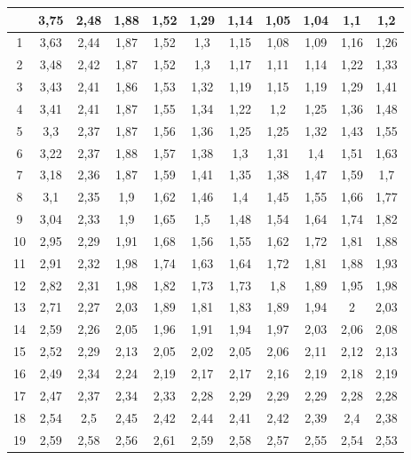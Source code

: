 \begin{longtable}[H]{|c|c|c|c|c|c|c|c|c|c|c|}
{    0 & 3,75 & 2,48 & 1,88 & 1,52 & 1,29 & 1,14 & 1,05 & 1,04 & 1,1 & 1,2  \\ \hline
    1 & 3,63 & 2,44 & 1,87 & 1,52 & 1,3 & 1,15 & 1,08 & 1,09 & 1,16 & 1,26  \\ \hline
    2 & 3,48 & 2,42 & 1,87 & 1,52 & 1,3 & 1,17 & 1,11 & 1,14 & 1,22 & 1,33  \\ \hline
    3 & 3,43 & 2,41 & 1,86 & 1,53 & 1,32 & 1,19 & 1,15 & 1,19 & 1,29 & 1,41  \\ \hline
    4 & 3,41 & 2,41 & 1,87 & 1,55 & 1,34 & 1,22 & 1,2 & 1,25 & 1,36 & 1,48  \\ \hline
    5 & 3,3 & 2,37 & 1,87 & 1,56 & 1,36 & 1,25 & 1,25 & 1,32 & 1,43 & 1,55  \\ \hline
    6 & 3,22 & 2,37 & 1,88 & 1,57 & 1,38 & 1,3 & 1,31 & 1,4 & 1,51 & 1,63  \\ \hline
    7 & 3,18 & 2,36 & 1,87 & 1,59 & 1,41 & 1,35 & 1,38 & 1,47 & 1,59 & 1,7  \\ \hline
    8 & 3,1 & 2,35 & 1,9 & 1,62 & 1,46 & 1,4 & 1,45 & 1,55 & 1,66 & 1,77  \\ \hline
    9 & 3,04 & 2,33 & 1,9 & 1,65 & 1,5 & 1,48 & 1,54 & 1,64 & 1,74 & 1,82  \\ \hline
    10 & 2,95 & 2,29 & 1,91 & 1,68 & 1,56 & 1,55 & 1,62 & 1,72 & 1,81 & 1,88  \\ \hline
    11 & 2,91 & 2,32 & 1,98 & 1,74 & 1,63 & 1,64 & 1,72 & 1,81 & 1,88 & 1,93  \\ \hline
    12 & 2,82 & 2,31 & 1,98 & 1,82 & 1,73 & 1,73 & 1,8 & 1,89 & 1,95 & 1,98  \\ \hline
    13 & 2,71 & 2,27 & 2,03 & 1,89 & 1,81 & 1,83 & 1,89 & 1,94 & 2 & 2,03  \\ \hline
    14 & 2,59 & 2,26 & 2,05 & 1,96 & 1,91 & 1,94 & 1,97 & 2,03 & 2,06 & 2,08  \\ \hline
    15 & 2,52 & 2,29 & 2,13 & 2,05 & 2,02 & 2,05 & 2,06 & 2,11 & 2,12 & 2,13  \\ \hline
    16 & 2,49 & 2,34 & 2,24 & 2,19 & 2,17 & 2,17 & 2,16 & 2,19 & 2,18 & 2,19  \\ \hline
    17 & 2,47 & 2,37 & 2,34 & 2,33 & 2,28 & 2,29 & 2,29 & 2,29 & 2,28 & 2,28  \\ \hline
    18 & 2,54 & 2,5 & 2,45 & 2,42 & 2,44 & 2,41 & 2,42 & 2,39 & 2,4 & 2,38  \\ \hline
    19  & 2,59 & 2,58 & 2,56 & 2,61 & 2,59 & 2,58 & 2,57 & 2,55 & 2,54 & 2,53 \\ \hline
    \end{longtable}

